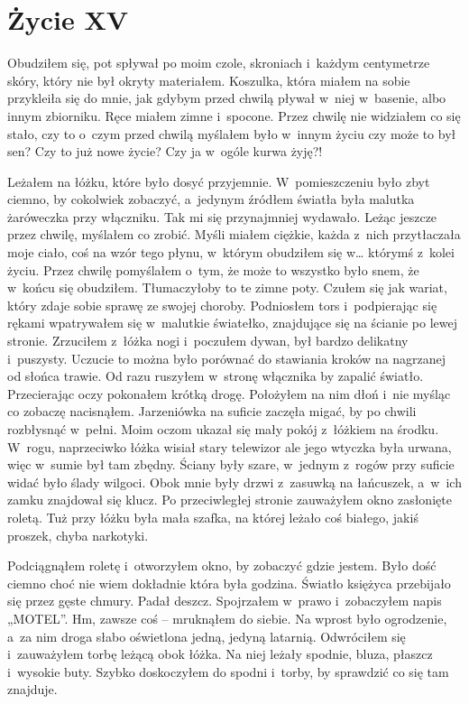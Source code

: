 \chapter{Życie XV}

Obudziłem się, pot spływał po moim czole, skroniach i~każdym centymetrze skóry, który nie był okryty materiałem. Koszulka, która miałem na sobie przykleiła się do mnie, jak gdybym przed chwilą pływał w~niej w~basenie, albo innym zbiorniku. Ręce miałem zimne i~spocone. Przez chwilę nie widziałem co się stało, czy to o~czym przed chwilą myślałem było w~innym życiu czy może to był sen? Czy to już nowe życie? Czy ja w~ogóle kurwa żyję?! 

Leżałem na łóżku, które było dosyć przyjemnie. W~pomieszczeniu było zbyt ciemno, by cokolwiek zobaczyć, a~jedynym źródłem światła była malutka żaróweczka przy włączniku. Tak mi się przynajmniej wydawało. Leżąc jeszcze przez chwilę, myślałem co zrobić. Myśli miałem ciężkie, każda z~nich przytłaczała moje ciało, coś na wzór tego płynu, w~którym obudziłem się w… którymś z~kolei życiu. Przez chwilę pomyślałem o~tym, że może to wszystko było snem, że w~końcu się obudziłem. Tłumaczyłoby to te zimne poty. Czułem się jak wariat, który zdaje sobie sprawę ze swojej choroby. Podniosłem tors i~podpierając się rękami wpatrywałem się w~malutkie światełko, znajdujące się na ścianie po lewej stronie. Zrzuciłem z~łóżka nogi i~poczułem dywan, był bardzo delikatny i~puszysty. Uczucie to można było porównać do stawiania kroków na nagrzanej od słońca trawie. Od razu ruszyłem w~stronę włącznika by zapalić światło. Przecierając oczy pokonałem krótką drogę. Położyłem na nim dłoń i~nie myśląc co zobaczę nacisnąłem. Jarzeniówka na suficie zaczęła migać, by po chwili rozbłysnąć w~pełni. Moim oczom ukazał się mały pokój z~łóżkiem na środku. W~rogu, naprzeciwko łóżka wisiał stary telewizor ale jego wtyczka była urwana, więc w~sumie był tam zbędny. Ściany były szare, w~jednym z~rogów przy suficie widać było ślady wilgoci. Obok mnie były drzwi z~zasuwką na łańcuszek, a~w~ich zamku znajdował się klucz. Po przeciwległej stronie zauważyłem okno zasłonięte roletą. Tuż przy łóżku była mała szafka, na której leżało coś białego, jakiś proszek, chyba narkotyki. 

Podciągnąłem roletę i~otworzyłem okno, by zobaczyć gdzie jestem. Było dość ciemno choć nie wiem dokładnie która była godzina. Światło księżyca przebijało się przez gęste chmury. Padał deszcz. Spojrzałem w~prawo i~zobaczyłem napis „MOTEL”. Hm, zawsze coś -- mruknąłem do siebie. Na wprost było ogrodzenie, a~za nim droga słabo oświetlona jedną, jedyną latarnią. Odwróciłem się i~zauważyłem torbę leżącą obok łóżka. Na niej leżały spodnie, bluza, płaszcz i~wysokie buty. Szybko doskoczyłem do spodni i~torby, by sprawdzić co się tam znajduje. 

